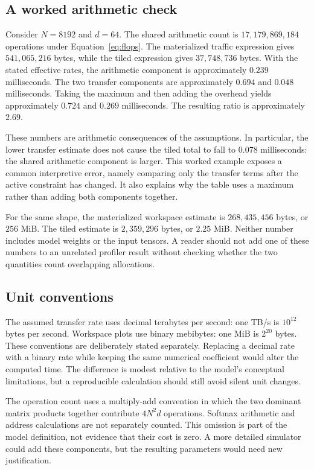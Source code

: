 \subsection{A worked arithmetic check}
Consider $N=8192$ and $d=64$. The shared arithmetic count is $17{,}179{,}869{,}184$ operations under Equation~\ref{eq:flops}. The materialized traffic expression gives $541{,}065{,}216$ bytes, while the tiled expression gives $37{,}748{,}736$ bytes. With the stated effective rates, the arithmetic component is approximately $0.239$ milliseconds. The two transfer components are approximately $0.694$ and $0.048$ milliseconds. Taking the maximum and then adding the overhead yields approximately $0.724$ and $0.269$ milliseconds. The resulting ratio is approximately $2.69$.

These numbers are arithmetic consequences of the assumptions. In particular, the lower transfer estimate does not cause the tiled total to fall to $0.078$ milliseconds: the shared arithmetic component is larger. This worked example exposes a common interpretive error, namely comparing only the transfer terms after the active constraint has changed. It also explains why the table uses a maximum rather than adding both components together.

For the same shape, the materialized workspace estimate is $268{,}435{,}456$ bytes, or $256$ MiB. The tiled estimate is $2{,}359{,}296$ bytes, or $2.25$ MiB. Neither number includes model weights or the input tensors. A reader should not add one of these numbers to an unrelated profiler result without checking whether the two quantities count overlapping allocations.

\subsection{Unit conventions}
The assumed transfer rate uses decimal terabytes per second: one TB/s is $10^{12}$ bytes per second. Workspace plots use binary mebibytes: one MiB is $2^{20}$ bytes. These conventions are deliberately stated separately. Replacing a decimal rate with a binary rate while keeping the same numerical coefficient would alter the computed time. The difference is modest relative to the model's conceptual limitations, but a reproducible calculation should still avoid silent unit changes.

The operation count uses a multiply-add convention in which the two dominant matrix products together contribute $4N^2d$ operations. Softmax arithmetic and address calculations are not separately counted. This omission is part of the model definition, not evidence that their cost is zero. A more detailed simulator could add these components, but the resulting parameters would need new justification.

